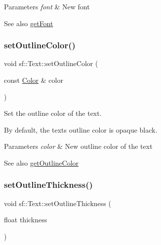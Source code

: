 \begin{DoxyParams}{Parameters}
{\em font} & New font\\
\hline
\end{DoxyParams}
\begin{DoxySeeAlso}{See also}
\hyperlink{classsf_1_1_text_a47cd96d7b2c37b2f820e4d6e1bb83f96}{get\+Font} 
\end{DoxySeeAlso}
\mbox{\label{classsf_1_1_text_aa19ec69c3b894e963602a6804ca68fe4}} 
\subsubsection{\texorpdfstring{set\+Outline\+Color()}{setOutlineColor()}}
{\footnotesize\ttfamily void sf\+::\+Text\+::set\+Outline\+Color (\begin{DoxyParamCaption}\item[{const \hyperlink{classsf_1_1_color}{Color} \&}]{color }\end{DoxyParamCaption})}



Set the outline color of the text. 

By default, the text\textquotesingle{}s outline color is opaque black.


\begin{DoxyParams}{Parameters}
{\em color} & New outline color of the text\\
\hline
\end{DoxyParams}
\begin{DoxySeeAlso}{See also}
\hyperlink{classsf_1_1_text_a53559d563461089f1172571b375442dc}{get\+Outline\+Color} 
\end{DoxySeeAlso}
\mbox{\label{classsf_1_1_text_ab0e6be3b40124557bf53737fe6a6ce77}} 
\subsubsection{\texorpdfstring{set\+Outline\+Thickness()}{setOutlineThickness()}}
{\footnotesize\ttfamily void sf\+::\+Text\+::set\+Outline\+Thickness (\begin{DoxyParamCaption}\item[{float}]{thickness }\end{DoxyParamCaption})}




